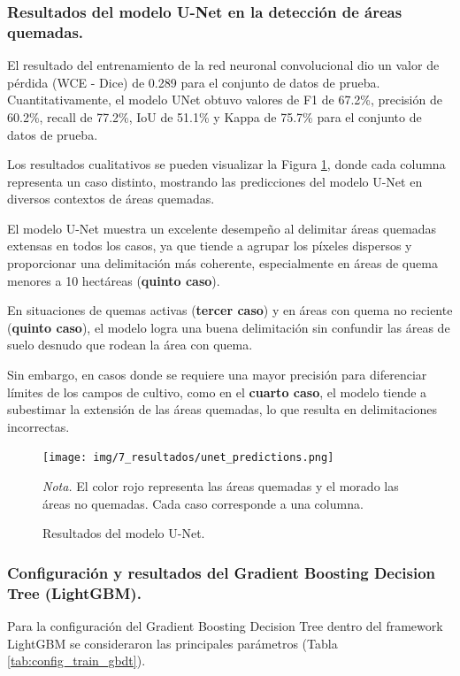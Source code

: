 \subsubsection{Resultados del modelo U-Net en la detección de áreas quemadas.}
El resultado del entrenamiento de la red neuronal convolucional dio un valor de pérdida (WCE - Dice) de 0.289 para el
conjunto de datos de prueba. Cuantitativamente, el modelo UNet obtuvo valores de F1 de 67.2\%, precisión de 60.2\%, 
recall de 77.2\%, IoU de 51.1\% y Kappa de 75.7\% para el conjunto de datos de prueba.

Los resultados cualitativos se pueden visualizar la Figura \ref{fig:unet_resultados}, donde cada columna representa un caso distinto, mostrando las 
predicciones del modelo U-Net en diversos contextos de áreas quemadas.

El modelo U-Net muestra un excelente desempeño al delimitar áreas quemadas extensas en todos los casos, ya que tiende a agrupar 
los píxeles dispersos y proporcionar una delimitación más coherente, especialmente en áreas de quema menores a 10 hectáreas (\textbf{quinto caso}).

En situaciones de quemas activas (\textbf{tercer caso}) y en áreas con quema no reciente (\textbf{quinto caso}), el modelo logra 
una buena delimitación sin confundir las áreas de suelo desnudo que rodean la área con quema.

Sin embargo, en casos donde se requiere una mayor precisión para diferenciar límites de los campos de cultivo, como en el \textbf{cuarto caso}, 
el modelo tiende a subestimar la extensión de las áreas quemadas, lo que resulta en delimitaciones incorrectas.

\begin{figure}[H]
    \centering
    \caption{Resultados del modelo U-Net.}
    \label{fig:unet_resultados}
    \texttt{[image: img/7\_resultados/unet\_predictions.png]}
    \begin{flushleft}
        \vspace{-\baselineskip}
        \textit{Nota.} El color rojo representa las áreas quemadas y el morado las áreas no quemadas. Cada caso corresponde a una columna.
        \vspace{-\baselineskip}
    \end{flushleft}
\end{figure}

\subsubsection{Configuración y resultados del Gradient Boosting Decision Tree (LightGBM).}
Para la configuración del Gradient Boosting Decision Tree dentro del framework LightGBM se consideraron las principales parámetros 
(Tabla \ref{tab:config_train_gbdt}).

